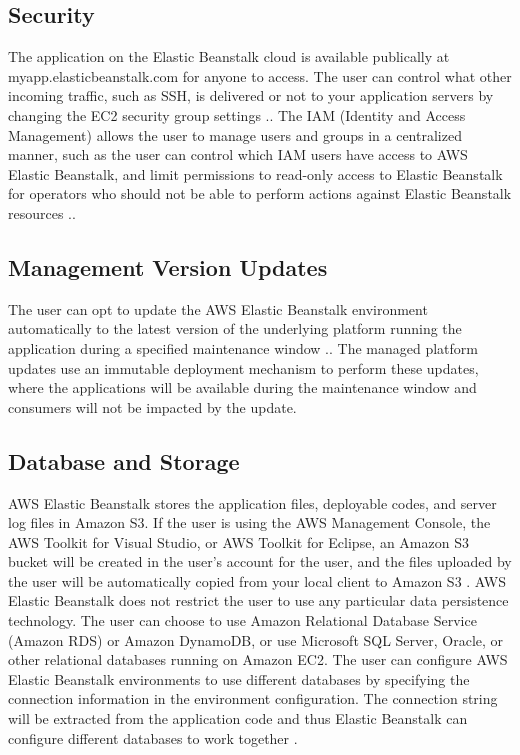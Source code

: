 \documentclass[9pt,twocolumn,twoside]{../../styles/osajnl}
\begin{document}
\subsection{Security}

The application on the Elastic Beanstalk cloud is available publically
at myapp.elasticbeanstalk.com for anyone to access. The user can
control what other incoming traffic, such as SSH, is delivered or not
to your application servers by changing the EC2 security group
settings \cite{elastic-faq}.. The IAM (Identity and Access Management)
allows the user to manage users and groups in a centralized manner,
such as the user can control which IAM users have access to AWS
Elastic Beanstalk, and limit permissions to read-only access to
Elastic Beanstalk for operators who should not be able to perform
actions against Elastic Beanstalk resources \cite{elastic-faq}..

\subsection{Management Version Updates}

The user can opt to update the AWS Elastic Beanstalk environment
automatically to the latest version of the underlying platform running
the application during a specified maintenance window
\cite{elastic-faq}..  The managed platform updates use an immutable
deployment mechanism to perform these updates, where the applications
will be available during the maintenance window and consumers will not
be impacted by the update.

\subsection{Database and Storage}

AWS Elastic Beanstalk stores the application files, deployable codes,
and server log files in Amazon S3. If the user is using the AWS
Management Console, the AWS Toolkit for Visual Studio, or AWS Toolkit
for Eclipse, an Amazon S3 bucket will be created in the user's account
for the user, and the files uploaded by the user will be automatically
copied from your local client to Amazon S3 \cite{elastic-faq}. AWS
Elastic Beanstalk does not restrict the user to use any particular
data persistence technology. The user can choose to use Amazon
Relational Database Service (Amazon RDS) or Amazon DynamoDB, or use
Microsoft SQL Server, Oracle, or other relational databases running on
Amazon EC2. The user can configure AWS Elastic Beanstalk environments
to use different databases by specifying the connection information in
the environment configuration. The connection string will be extracted
from the application code and thus Elastic Beanstalk can configure
different databases to work together \cite{elastic-faq}.
\end{document}
